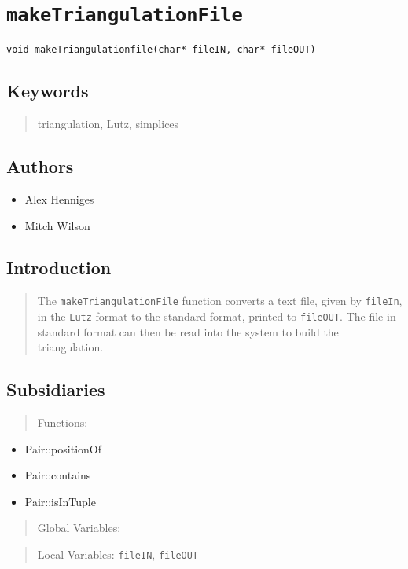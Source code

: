 \documentclass[10pt]{article}%
\begin{document}

\section*{\texttt{makeTriangulationFile}}

\label{f0}{\small{\begin{verbatim} 
void makeTriangulationfile(char* fileIN, char* fileOUT)
\end{verbatim}
}}

\subsection*{Keywords}

\begin{quotation} triangulation, Lutz, simplices\end{quotation}

\subsection*{Authors}

\begin{itemize}\item  Alex Henniges
\item  Mitch Wilson
\end{itemize}

\subsection*{Introduction}

\begin{quotation} The \texttt{makeTriangulationFile} function converts a text file, given by \texttt{fileIn}, in the \texttt{Lutz} format to the standard format, printed to \texttt{fileOUT}. The file in standard format can then be read into the system to build the triangulation.\end{quotation}

\subsection*{Subsidiaries}

\begin{quotation} Functions:\end{quotation}
\begin{itemize}
\item  Pair::positionOf
\item  Pair::contains
\item  Pair::isInTuple
\end{itemize}
\begin{quotation} Global Variables:\end{quotation}
\begin{quotation} Local Variables: \texttt{fileIN}, \texttt{fileOUT}\end{quotation}
\end{document}
